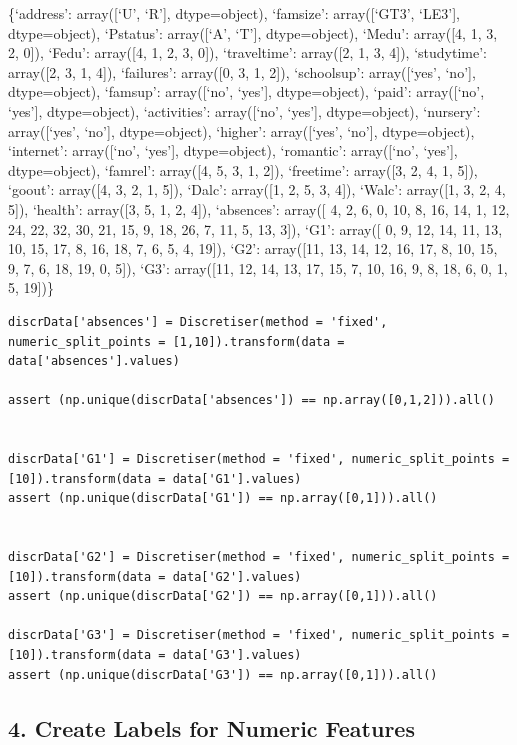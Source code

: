 \documentclass[
]{article}
\begin{document}
\{`address': array({[}`U', `R'{]}, dtype=object), `famsize':
array({[}`GT3', `LE3'{]}, dtype=object), `Pstatus': array({[}`A',
`T'{]}, dtype=object), `Medu': array({[}4, 1, 3, 2, 0{]}), `Fedu':
array({[}4, 1, 2, 3, 0{]}), `traveltime': array({[}2, 1, 3, 4{]}),
`studytime': array({[}2, 3, 1, 4{]}), `failures': array({[}0, 3, 1,
2{]}), `schoolsup': array({[}`yes', `no'{]}, dtype=object), `famsup':
array({[}`no', `yes'{]}, dtype=object), `paid': array({[}`no', `yes'{]},
dtype=object), `activities': array({[}`no', `yes'{]}, dtype=object),
`nursery': array({[}`yes', `no'{]}, dtype=object), `higher':
array({[}`yes', `no'{]}, dtype=object), `internet': array({[}`no',
`yes'{]}, dtype=object), `romantic': array({[}`no', `yes'{]},
dtype=object), `famrel': array({[}4, 5, 3, 1, 2{]}), `freetime':
array({[}3, 2, 4, 1, 5{]}), `goout': array({[}4, 3, 2, 1, 5{]}), `Dalc':
array({[}1, 2, 5, 3, 4{]}), `Walc': array({[}1, 3, 2, 4, 5{]}),
`health': array({[}3, 5, 1, 2, 4{]}), `absences': array({[} 4, 2, 6, 0,
10, 8, 16, 14, 1, 12, 24, 22, 32, 30, 21, 15, 9, 18, 26, 7, 11, 5, 13,
3{]}), `G1': array({[} 0, 9, 12, 14, 11, 13, 10, 15, 17, 8, 16, 18, 7,
6, 5, 4, 19{]}), `G2': array({[}11, 13, 14, 12, 16, 17, 8, 10, 15, 9, 7,
6, 18, 19, 0, 5{]}), `G3': array({[}11, 12, 14, 13, 17, 15, 7, 10, 16,
9, 8, 18, 6, 0, 1, 5, 19{]})\}

\begin{verbatim}
discrData['absences'] = Discretiser(method = 'fixed', numeric_split_points = [1,10]).transform(data = data['absences'].values)

assert (np.unique(discrData['absences']) == np.array([0,1,2])).all()


discrData['G1'] = Discretiser(method = 'fixed', numeric_split_points = [10]).transform(data = data['G1'].values)
assert (np.unique(discrData['G1']) == np.array([0,1])).all()


discrData['G2'] = Discretiser(method = 'fixed', numeric_split_points = [10]).transform(data = data['G2'].values)
assert (np.unique(discrData['G2']) == np.array([0,1])).all()

discrData['G3'] = Discretiser(method = 'fixed', numeric_split_points = [10]).transform(data = data['G3'].values)
assert (np.unique(discrData['G3']) == np.array([0,1])).all()
\end{verbatim}

\hypertarget{create-labels-for-numeric-features}{%
\subsection{4. Create Labels for Numeric
Features}\label{create-labels-for-numeric-features}}
\end{document}
